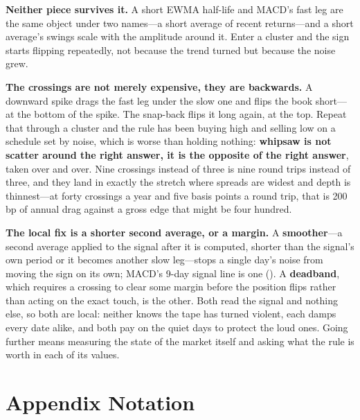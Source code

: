 \textbf{Neither piece survives it.} A short EWMA half-life and MACD's fast leg are the same object
under two names---a short average of recent returns---and a short average's swings scale with the
amplitude around it. Enter a cluster and the sign starts flipping repeatedly, not because the trend
turned but because the noise grew.


\textbf{The crossings are not merely expensive, they are backwards.} A downward spike drags the fast
leg under the slow one and flips the book short---at the bottom of the spike. The snap-back flips it
long again, at the top. Repeat that through a cluster and the rule has been buying high and selling
low on a schedule set by noise, which is worse than holding nothing: \textbf{whipsaw is not scatter
around the right answer, it is the opposite of the right answer}, taken over and over. Nine
crossings instead of three is nine round trips instead of three, and they land in exactly the
stretch where spreads are widest and depth is thinnest---at forty crossings a year and five basis
points a round trip, that is 200 bp of annual drag against a gross edge that might be four hundred.

\textbf{The local fix is a shorter second average, or a margin.} A \textbf{smoother}---a second
average applied to the signal after it is computed, shorter than the signal's own period or it
becomes another slow leg---stops a single day's noise from moving the sign on its own; MACD's 9-day
signal line is one (). A \textbf{deadband}, which requires a crossing to
clear some margin before the position flips rather than acting on the exact touch, is the other.
Both read the signal and nothing else, so both are local: neither knows the tape has turned violent,
each damps every date alike, and both pay on the quiet days to protect the loud ones. Going further
means measuring the state of the market itself and asking what the rule is worth in each of its
values.



\section*{Appendix \midot{} Notation}


